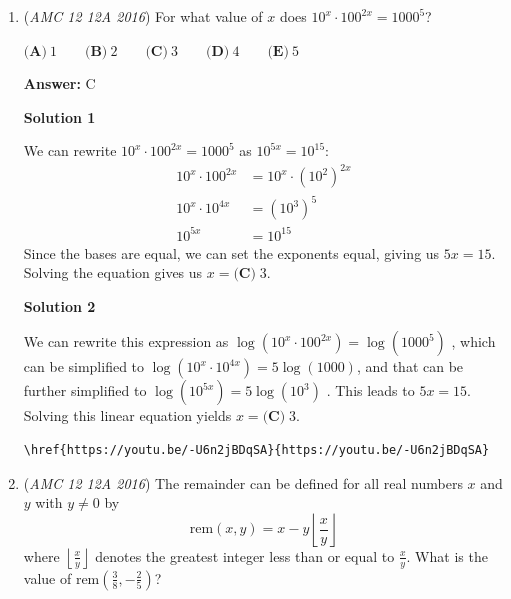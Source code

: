 \begin{enumerate}
 Hence
 \[\frac{I_{11} - I_{10}}{I_9} = \frac{11 I_{10}}{I_9} - 10.\]Do another integration by parts to relate \( I_{10} \) and \( I_9 \):
 \[I_{10} = \int_0^\infty x^{10} e^{-x} \, dx = \left[ -x^{10} e^{-x} \right]_0^\infty + 10 \int_0^\infty x^9 e^{-x} \, dx = 10 I_9.\]Therefore
 \[\frac{I_{11} - I_{10}}{I_9} = 11 \cdot 10 - 10 = 100.\]
$\boxed{(B) 100}$.

 \begin{verbatim}
\href{https://youtu.be/r5G98oPPyNM}{https://youtu.be/r5G98oPPyNM}
\end{verbatim}





	\item (\textit{AMC 12 12A 2016}) For what value of $x$ does $10^x \cdot 100^{2x} = 1000^5$?


 $\textbf{(A)}\ 1\qquad\textbf{(B)}\ 2\qquad\textbf{(C)}\ 3\qquad\textbf{(D)}\ 4\qquad\textbf{(E)}\ 5$

 \textbf{Answer: }C



\textbf{Solution 1}

We can rewrite $10^{x}\cdot 100^{2x}=1000^{5}$ as $10^{5x}=10^{15}$:
 \[\begin{split} 10^x\cdot100^{2x} & =10^x\cdot(10^2)^{2x} \\ 10^x\cdot10^{4x} & =(10^3)^5 \\ 10^{5x} & =10^{15} \end{split}\]Since the bases are equal, we can set the exponents equal, giving us $5x=15$. Solving the equation gives us $x = \boxed{\textbf{(C)}\;3}.$




\textbf{Solution 2}

We can rewrite this expression as $\log(10^x \cdot 100^{2x})=\log(1000^5)$ , which can be simplified to $\log(10^{x}\cdot10^{4x})=5\log(1000)$, and that can be further simplified to $\log(10^{5x})=5\log(10^3)$ . This leads to $5x=15$. Solving this linear equation yields $x = \boxed{\textbf{(C)}\;3}.$
\begin{verbatim}
\href{https://youtu.be/-U6n2jBDqSA}{https://youtu.be/-U6n2jBDqSA}
\end{verbatim}





	\item (\textit{AMC 12 12A 2016}) The remainder can be defined for all real numbers $x$ and $y$ with $y \neq 0$ by 
 \[\text{rem} (x ,y)=x-y\left \lfloor \frac{x}{y} \right \rfloor\]where $\left \lfloor \frac{x}{y} \right \rfloor$ denotes the greatest integer less than or equal to $\frac{x}{y}$. What is the value of $\text{rem} (\frac{3}{8}, -\frac{2}{5} )$?



\end{enumerate}
